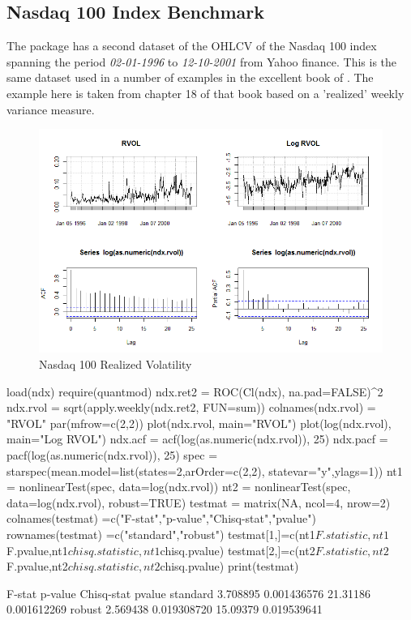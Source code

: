\subsection{Nasdaq 100 Index Benchmark}
The package has a second dataset of the OHLCV of the Nasdaq 100 index spanning
the period \emph{02-01-1996} to \emph{12-10-2001} from Yahoo finance. This
is the same dataset used in a number of examples in the excellent book of
\cite{Zivot2007}. The example here is taken from chapter 18 of that book based
on a 'realized' weekly variance measure.
\begin{figure}[ht]
\centering
\includegraphics[scale=0.35]{ndxplot}
\caption{Nasdaq 100 Realized Volatility}
\label{fig:ndx}
\end{figure}
\begin{Schunk}
\begin{Sinput}
load(ndx)
require(quantmod)
ndx.ret2 = ROC(Cl(ndx), na.pad=FALSE)^2
ndx.rvol = sqrt(apply.weekly(ndx.ret2, FUN=sum))
colnames(ndx.rvol) = "RVOL"
par(mfrow=c(2,2))
plot(ndx.rvol, main="RVOL")
plot(log(ndx.rvol), main="Log RVOL")
ndx.acf = acf(log(as.numeric(ndx.rvol)), 25)
ndx.pacf = pacf(log(as.numeric(ndx.rvol)), 25)
spec = starspec(mean.model=list(states=2,arOrder=c(2,2),
statevar="y",ylags=1))
nt1 = nonlinearTest(spec, data=log(ndx.rvol))
nt2 = nonlinearTest(spec, data=log(ndx.rvol), robust=TRUE)
testmat = matrix(NA, ncol=4, nrow=2)
colnames(testmat) =c("F-stat","p-value","Chisq-stat","pvalue")
rownames(testmat) =c("standard","robust")
testmat[1,]=c(nt1$F.statistic,nt1$F.pvalue,nt1$chisq.statistic,nt1$chisq.pvalue)
testmat[2,]=c(nt2$F.statistic,nt2$F.pvalue,nt2$chisq.statistic,nt2$chisq.pvalue)
print(testmat)
\end{Sinput}
\begin{Soutput}


           F-stat     p-value Chisq-stat      pvalue
standard 3.708895 0.001436576   21.31186 0.001612269
robust   2.569438 0.019308720   15.09379 0.019539641
\end{Soutput}
\end{Schunk}
